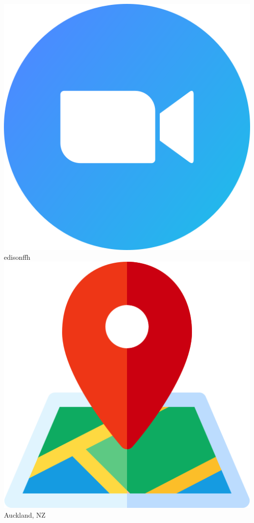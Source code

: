 \begin{center}
    \includegraphics[scale=0.036]{figs/zoom.png}
    edisonffh
    \hspace*{5mm}
    \includegraphics[scale=0.03]{figs/map.png}
    Auckland, NZ
\end{center}
